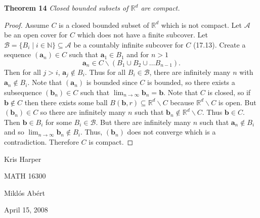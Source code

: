 \documentclass{article}
\begin{document}
\begin{flushleft}
\textbf{Theorem 14}
\textsl{Closed bounded subsets of $\mathbb{R}^d$ are compact.}
\begin{proof}
Assume $C$ is a closed bounded subset of $\mathbb{R}^d$ which is not compact. Let $\mathcal{A}$ be an open cover for $C$ which does not have a finite subcover. Let $\mathcal{B} = \{B_i \mid i \in \mathbb{N}\} \subseteq \mathcal{A}$ be a countably infinite subcover for $C$ (17.13). Create a sequence $(\mathbf{a}_n) \in C$ such that $\mathbf{a}_1 \in B_1$ and for $n>1$
\[
\mathbf{a}_n \in C \backslash (B_1 \cup B_2 \cup \dots B_{n-1}).
\]
Then for all $j > i$, $\mathbf{a}_j \notin B_i$. Thus for all $B_i \in \mathcal{B}$, there are infinitely many $n$ with $\mathbf{a}_n \notin B_i$. Note that $(\mathbf{a}_n)$ is bounded since $C$ is bounded, so there exists a subsequence $(\mathbf{b}_n) \in C$ such that $\lim_{n \rightarrow \infty} \mathbf{b}_n = \mathbf{b}$. Note that $C$ is closed, so if $\mathbf{b} \notin C$ then there exists some ball $B(\mathbf{b}, r) \subseteq \mathbb{R}^d \backslash C$ because $\mathbb{R}^d \backslash C$ is open. But $(\mathbf{b}_n) \in C$ so there are infinitely many $n$ such that $\mathbf{b}_n \notin \mathbb{R}^d \backslash C$. Thus $\mathbf{b} \in C$. Then $\mathbf{b} \in B_i$ for some $B_i \in \mathcal{B}$. But there are infinitely many $n$ such that $\mathbf{a}_n \notin B_i$ and so $\lim_{n \rightarrow \infty} \mathbf{b}_n \notin B_i$. Thus, $(\mathbf{b}_n)$ does not converge which is a contradiction. Therefore $C$ is compact.
\end{proof}

\end{flushleft}

\newpage

\begin{flushright}
Kris Harper

MATH 16300

Mikl\'{o}s Ab\'{e}rt

April 15, 2008
\end{flushright}
\end{document}
